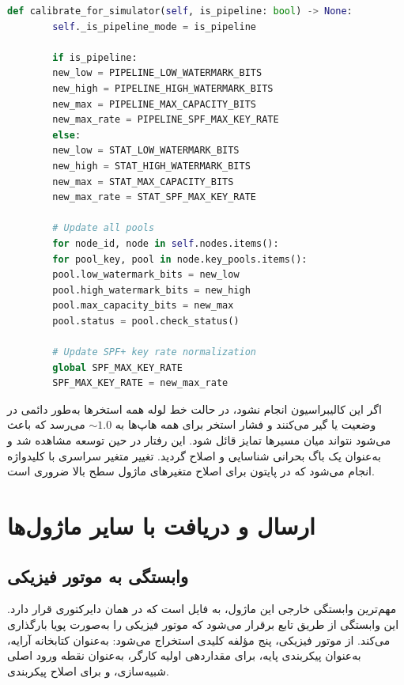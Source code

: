 \begin{LTR}
	\begin{lstlisting}[language=Python]
		def calibrate_for_simulator(self, is_pipeline: bool) -> None:
		self._is_pipeline_mode = is_pipeline
		
		if is_pipeline:
		new_low = PIPELINE_LOW_WATERMARK_BITS
		new_high = PIPELINE_HIGH_WATERMARK_BITS
		new_max = PIPELINE_MAX_CAPACITY_BITS
		new_max_rate = PIPELINE_SPF_MAX_KEY_RATE
		else:
		new_low = STAT_LOW_WATERMARK_BITS
		new_high = STAT_HIGH_WATERMARK_BITS
		new_max = STAT_MAX_CAPACITY_BITS
		new_max_rate = STAT_SPF_MAX_KEY_RATE
		
		# Update all pools
		for node_id, node in self.nodes.items():
		for pool_key, pool in node.key_pools.items():
		pool.low_watermark_bits = new_low
		pool.high_watermark_bits = new_high
		pool.max_capacity_bits = new_max
		pool.status = pool.check_status()
		
		# Update SPF+ key rate normalization
		global SPF_MAX_KEY_RATE
		SPF_MAX_KEY_RATE = new_max_rate
	\end{lstlisting}
\end{LTR}

اگر این کالیبراسیون انجام نشود، در حالت خط لوله همه استخرها به‌طور دائمی در وضعیت  یا  گیر می‌کنند و فشار استخر برای همه هاپ‌ها به $\sim 1.0$ می‌رسد که باعث می‌شود  نتواند میان مسیرها تمایز قائل شود. این رفتار در حین توسعه مشاهده شد و به‌عنوان یک باگ بحرانی شناسایی و اصلاح گردید. تغییر متغیر سراسری  با کلیدواژه  انجام می‌شود که در پایتون برای اصلاح متغیرهای ماژول سطح بالا ضروری است.

\section{ارسال و دریافت با سایر ماژول‌ها}

\subsection{وابستگی به موتور فیزیکی }

مهم‌ترین وابستگی خارجی این ماژول، به فایل  است که در همان دایرکتوری قرار دارد. این وابستگی از طریق تابع  برقرار می‌شود که موتور فیزیکی را به‌صورت پویا بارگذاری می‌کند. از موتور فیزیکی، پنج مؤلفه کلیدی استخراج می‌شود:  به‌عنوان کتابخانه آرایه،  به‌عنوان پیکربندی پایه،  برای مقداردهی اولیه کارگر،  به‌عنوان نقطه ورود اصلی شبیه‌سازی، و  برای اصلاح پیکربندی.

